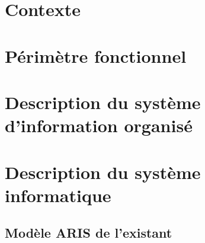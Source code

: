 

\newcommand{\mainTitle}{\'Etude préalable - SPIE}
\newcommand{\secondTitle}{\'Etude de l'\'Existant}
\newcommand{\documentRef}{DEB-EE/4401/1}





\tableofcontents
\listoffigures
\listoftables
\newpage

\part{Contexte}
\setcounter{section}{0}

\part{Périmètre fonctionnel}
\setcounter{section}{0}

\part{Description du système d'information organisé}
\setcounter{section}{0}

\part{Description du système informatique}
\setcounter{section}{0}



\appendix
\chapter{Modèle ARIS de l'existant}

